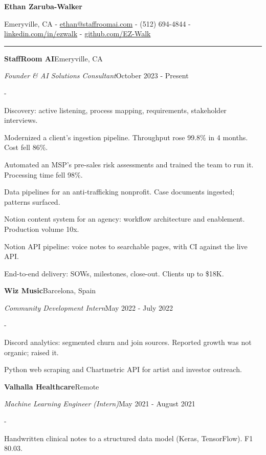 \documentclass[10pt,letterpaper]{article}
\newenvironment{cvitems}{%
  \begin{list}{-}{%
    \setlength{\leftmargin}{12pt}%
    \setlength{\itemsep}{1.2pt}%
    \setlength{\parsep}{0pt}%
    \setlength{\topsep}{1.5pt}%
    \setlength{\partopsep}{0pt}%
    \setlength{\labelwidth}{6pt}%
    \setlength{\labelsep}{6pt}%
    \setlength{\itemindent}{0pt}%
  }%
}{\end{list}}
\newcommand{\cvsection}[1]{%
  \vspace{7pt}%
  \noindent{\bfseries\fontsize{11pt}{13pt}\selectfont\MakeUppercase{#1}}\par
  \vspace{1pt}%
  \noindent\rule{\textwidth}{0.4pt}\par
  \vspace{4pt}%
}
\newcommand{\cventryhead}[4]{%
  \noindent\textbf{#1}\hfill#2\par
  \vspace{0.5pt}%
  \noindent\textit{#3}\hfill#4\par
}
\begin{document}
\begin{center}
  {\bfseries\fontsize{22pt}{24pt}\selectfont Ethan Zaruba-Walker\par}
  \vspace{4pt}
  {\fontsize{10pt}{12pt}\selectfont
    Emeryville, CA
    {-}
    \href{mailto:ethan@staffroomai.com}{ethan@staffroomai.com}
    {-}
    (512) 694-4844
    {-}
    \href{https://linkedin.com/in/ezwalk}{linkedin.com/in/ezwalk}
    {-}
    \href{https://github.com/EZ-Walk}{github.com/EZ-Walk}\par}
\end{center}
\vspace{2pt}

\cvsection{Experience}

\cventryhead{StaffRoom AI}{Emeryville, CA}
{Founder \& AI Solutions Consultant}{October 2023 - Present}
\begin{cvitems}
  \item Discovery: active listening, process mapping, requirements, stakeholder interviews.
  \item Modernized a client's ingestion pipeline. Throughput rose 99.8\% in 4 months. Cost fell 86\%.
  \item Automated an MSP's pre-sales risk assessments and trained the team to run it. Processing time fell 98\%.
  \item Data pipelines for an anti-trafficking nonprofit. Case documents ingested; patterns surfaced.
  \item Notion content system for an agency: workflow architecture and enablement. Production volume 10x.
  \item Notion API pipeline: voice notes to searchable pages, with CI against the live API.
  \item End-to-end delivery: SOWs, milestones, close-out. Clients up to \$18K.
\end{cvitems}

\vspace{5pt}
\cventryhead{Wiz Music}{Barcelona, Spain}
{Community Development Intern}{May 2022 - July 2022}
\begin{cvitems}
  \item Discord analytics: segmented churn and join sources. Reported growth was not organic; raised it.
  \item Python web scraping and Chartmetric API for artist and investor outreach.
\end{cvitems}

\vspace{5pt}
\cventryhead{Valhalla Healthcare}{Remote}
{Machine Learning Engineer (Intern)}{May 2021 - August 2021}
\begin{cvitems}
  \item Handwritten clinical notes to a structured data model (Keras, TensorFlow). F1 80.03.
\end{cvitems}
\end{document}
